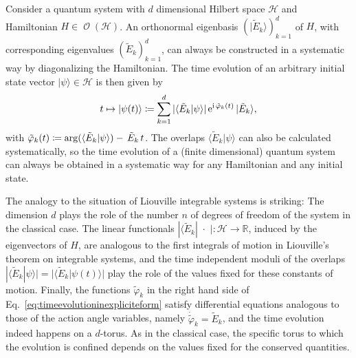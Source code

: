 \documentclass[a4paper,12pt,listof=totoc,index=totoc,bibliography=totoc,headsepline=false,headings=normal,BCOR16.153846mm,DIV12,headinclude,twoside,cleardoublepage=empty,numbers=noenddot,final]{scrreprt}
\theoremstyle{mystyle}
\numberwithin{equation}{section}
\numberwithin{figure}{section}
\numberwithin{lemma}{section}
\numberwithin{theorem}{section}
\numberwithin{corollary}{section}
\numberwithin{definition}{section}
\numberwithin{conjecture}{section}
\numberwithin{observation}{section}
\newcommand{\+}{\mkern2mu}
\newcommand{\coloneqq}{\mathrel{\vcentcolon\mkern-1.2mu=}} %
\newcommand{\texteqref}[1]{Eq.~\eqref{#1}}
\newcommand{\argdot}{{\,\cdot\,}}
\newcommand{\oftype}{\colon}
\renewcommand{\H}{H}
\newcommand{\bra}[1]{\langle #1|}
\newcommand{\ket}[1]{|#1\rangle}
\newcommand{\braket}[2]{\langle #1 | #2 \rangle}
\newcommand{\e}{\mathrm{e}}
\renewcommand{\i}{\mathrm{i}}
\DeclareMathOperator{\1}{\mathds{1}}
\DeclareMathOperator{\Obs}{\mathcal{O}}
\newcommand{\mc}[1]{\mathcal{#1}}
\newcommand{\mcH}{\mc{H}}
\newcommand{\mb}[1]{\mathbb{#1}}
\newcommand{\R}{\mb{R}}
\begin{document}
Consider a quantum system with $d$ dimensional Hilbert space $\mcH$ and Hamiltonian $\H \in \Obs(\mcH)$.
An orthonormal eigenbasis $(\ket{\tilde E_k})_{k=1}^d$ of $\H$, with corresponding eigenvalues $(\tilde E_k)_{k=1}^d$, can always be constructed in a systematic way by diagonalizing the Hamiltonian.
The time evolution of an arbitrary initial state vector $\ket \psi \in \mcH$ is then given by
\begin{equation}\label{eq:timeevolutioninexpliciteform}
  t \mapsto \ket{\psi(t)} \coloneqq \sum_{k=1}^d |\braket{\tilde E_k}{\psi}|\,\e^{\i\,\tilde\varphi_k(t)}\,\ket{\tilde E_k} ,
\end{equation}
with $\tilde\varphi_k(t) \coloneqq \arg(\braket{\tilde E_k}{\psi})-\,\tilde E_k\,t$.
The overlaps $\braket{\tilde E_k}{\psi}$ can also be calculated systematically, so the time evolution of a (finite dimensional) quantum system can always be obtained in a systematic way for any Hamiltonian and any initial state.

The analogy to the situation of Liouville integrable systems is striking:
The dimension $d$ plays the role of the number $n$ of degrees of freedom of the system in the classical case.
The linear functionals $|\bra{\tilde E_k} \,\argdot\, | \oftype \mcH \to \R$, induced by the eigenvectors of $\H$, are analogous to the first integrals of motion in Liouville's theorem on integrable systems, and the time independent moduli of the overlaps $|\braket{\tilde E_k}{\psi}| = |\braket{\tilde E_k}{\psi(t)}|$ play the role of the values fixed for these constants of motion. 
Finally, the functions $\tilde \varphi_k$ in the right hand side of \texteqref{eq:timeevolutioninexpliciteform} satisfy differential equations analogous to those of the action angle variables, namely $\dot{\tilde{\varphi}}_k = \tilde E_k$, and the time evolution indeed happens on a $d$-torus.
As in the classical case, the specific torus to which the evolution is confined depends on the values fixed for the conserved quantities.
\end{document}
